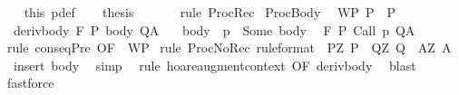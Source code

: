\begin{isabellebody}
\ \ \isamarkupfalse%
\ this\ p{\isacharunderscore}def\isanewline
\ \ \isamarkupfalse%
\ {\isacharquery}thesis\ \isanewline
\ \ \ \ \isamarkupfalse%
\ {\isacharparenleft}rule\ ProcRec{}{\isacharparenright}\isanewline
{}\isamarkupfalse%
%
\endisatagproof
{\isafoldproof}%
%
\isadelimproof
\isanewline
%
\endisadelimproof
\isanewline
{}\isamarkupfalse%
\ ProcBody{\isacharcolon}\isanewline
\ \ WP{\isacharcolon}\ {\isachardoublequoteopen}P\ {\isasymsubseteq}\ P{\isacharprime}{\isachardoublequoteclose}\isanewline
\ \ deriv{\isacharunderscore}body{\isacharcolon}\ {\isachardoublequoteopen}{\isasymGamma}{\isacharcomma}{\isasymTheta}{\isasymturnstile}\isactrlbsub {\isacharslash}F\isactrlesub \ P{\isacharprime}\ body\ Q{\isacharcomma}A{\isachardoublequoteclose}\ \isanewline
\ \ body{\isacharcolon}\ {\isachardoublequoteopen}{\isasymGamma}\ p\ {\isacharequal}\ Some\ body{\isachardoublequoteclose}\isanewline
\ \ {\isachardoublequoteopen}{\isasymGamma}{\isacharcomma}{\isasymTheta}{\isasymturnstile}\isactrlbsub {\isacharslash}F\isactrlesub \ P\ Call\ p\ Q{\isacharcomma}A{\isachardoublequoteclose}\isanewline
%
\isadelimproof
%
\endisadelimproof
%
\isatagproof
{}\isamarkupfalse%
\ {\isacharparenleft}rule\ conseqPre\ {\isacharbrackleft}OF\ {\isacharunderscore}\ WP{\isacharbrackright}{\isacharparenright}\isanewline
{}\isamarkupfalse%
\ {\isacharparenleft}rule\ ProcNoRec{}\ {\isacharbrackleft}rule{\isacharunderscore}format{\isacharcomma}\ \ P{\isacharequal}{\isachardoublequoteopen}{\isasymlambda}Z{\isachardot}\ P{\isacharprime}{\isachardoublequoteclose}\ \ Q{\isacharequal}{\isachardoublequoteopen}{\isasymlambda}Z{\isachardot}\ Q{\isachardoublequoteclose}\ \ A{\isacharequal}{\isachardoublequoteopen}{\isasymlambda}Z{\isachardot}\ A{\isachardoublequoteclose}{\isacharbrackright}{\isacharparenright}\ \isanewline
{}\isamarkupfalse%
\ \ {\isacharparenleft}insert\ body{\isacharparenright}\isanewline
{}\isamarkupfalse%
\ \ simp\isanewline
{}\isamarkupfalse%
\ \ {\isacharparenleft}rule\ hoare{\isacharunderscore}augment{\isacharunderscore}context\ {\isacharbrackleft}OF\ deriv{\isacharunderscore}body{\isacharbrackright}{\isacharparenright}\isanewline
{}\isamarkupfalse%
\ \ blast\isanewline
{}\isamarkupfalse%
\ fastforce\isanewline
{}\isamarkupfalse%

\end{isabellebody}
